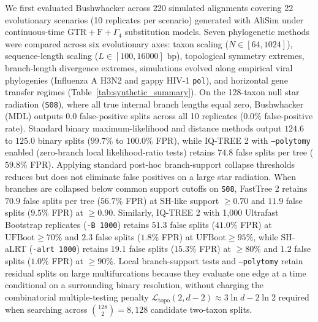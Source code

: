 \documentclass[11pt,a4paper]{article}
\begin{document}
We first evaluated Bushwhacker across 220 simulated alignments covering 22 evolutionary scenarios (10 replicates per scenario) generated with AliSim \citep{lytrong2022alisim} under continuous-time $\text{GTR}+\text{F}+\Gamma_4$ substitution models. Seven phylogenetic methods were compared across six evolutionary axes: taxon scaling ($N \in [64, 1024]$), sequence-length scaling ($L \in [100, 16000]\text{ bp}$), topological symmetry extremes, branch-length divergence extremes, simulations evolved along empirical viral phylogenies (Influenza A H3N2 and gappy HIV-1 \texttt{pol}), and horizontal gene transfer regimes (Table~\ref{tab:synthetic_summary}). On the 128-taxon null star radiation (\texttt{S08}), where all true internal branch lengths equal zero, Bushwhacker (MDL) outputs $0.0$ false-positive splits across all 10 replicates ($0.0\%$ false-positive rate). Standard binary maximum-likelihood and distance methods output $124.6$ to $125.0$ binary splits ($99.7\%$ to $100.0\%$ FPR), while IQ-TREE 2 with \texttt{--polytomy} enabled (zero-branch local likelihood-ratio tests) retains $74.8$ false splits per tree ($59.8\%$ FPR). Applying standard post-hoc branch-support collapse thresholds reduces but does not eliminate false positives on a large star radiation. When branches are collapsed below common support cutoffs on \texttt{S08}, FastTree 2 retains $70.9$ false splits per tree ($56.7\%$ FPR) at SH-like support $\ge 0.70$ and $11.9$ false splits ($9.5\%$ FPR) at $\ge 0.90$. Similarly, IQ-TREE 2 with 1,000 Ultrafast Bootstrap replicates (\texttt{-B 1000}) retains $51.3$ false splits ($41.0\%$ FPR) at $\text{UFBoot} \ge 70\%$ and $2.3$ false splits ($1.8\%$ FPR) at $\text{UFBoot} \ge 95\%$, while SH-aLRT (\texttt{-alrt 1000}) retains $19.1$ false splits ($15.3\%$ FPR) at $\ge 80\%$ and $1.2$ false splits ($1.0\%$ FPR) at $\ge 90\%$. Local branch-support tests and \texttt{--polytomy} retain residual splits on large multifurcations because they evaluate one edge at a time conditional on a surrounding binary resolution, without charging the combinatorial multiple-testing penalty $\mathcal{L}_{\text{topo}}(2, d-2) \approx 3\ln d - 2\ln 2$ required when searching across $\binom{128}{2} = 8,128$ candidate two-taxon splits.
\end{document}
